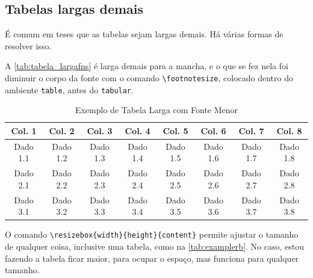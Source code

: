 \documentclass[dsc,setavermelha,numeracaoporcapitulo,linhanafolhaderosto]{ufrj}
\theoremstyle{plain}
\theoremstyle{definition}
\theoremstyle{remark}
\begin{document}
\subsection{Tabelas largas demais}

É comum em teses que as tabelas sejam largas demais. Há várias formas de resolver isso.

A \autoref{tab:tabela_largafns} é larga demais para a mancha, e o que se fez nela foi diminuir o corpo da fonte com o comando \verb|\footnotesize|, colocado dentro do ambiente \verb|table|, antes do \verb|tabular|.

\begin{table}[ht]
\centering %
\caption{Exemplo de Tabela Larga com Fonte Menor}
\label{tab:tabela_largafns}
\footnotesize %
\begin{tabular}{cccccccc} %
\toprule
\textbf{Col. 1} & \textbf{Col. 2} & \textbf{Col. 3} & \textbf{Col. 4} & \textbf{Col. 5} & \textbf{Col. 6} & \textbf{Col. 7} & \textbf{Col. 8} \\
\midrule
Dado 1.1 & Dado 1.2 & Dado 1.3 & Dado 1.4 & Dado 1.5 & Dado 1.6 & Dado 1.7 & Dado 1.8 \\
Dado 2.1 & Dado 2.2 & Dado 2.3 & Dado 2.4 & Dado 2.5 & Dado 2.6 & Dado 2.7 & Dado 2.8 \\
Dado 3.1 & Dado 3.2 & Dado 3.3 & Dado 3.4 & Dado 3.5 & Dado 3.6 & Dado 3.7 & Dado 3.8 \\
\bottomrule
\end{tabular}
\end{table}

O comando \verb|\resizebox{width}{height}{content}| permite ajustar o tamanho de qualquer coisa, inclusive uma tabela, como na \autoref{tab:examplerb}. No caso, estou fazendo a tabela ficar maior, para ocupar o espaço, mas funciona para qualquer tamanho.

\begin{table}[ht]
\centering
\caption{Exemplo de Tabela Redimensionada}
\label{tab:examplerb}
\end{table}
\end{document}
